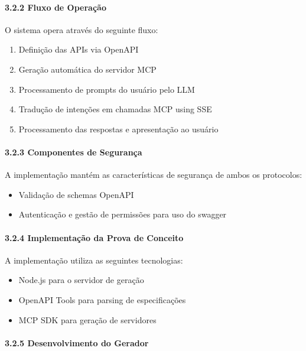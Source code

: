 \documentclass[
]{article}
\providecommand{\tightlist}{%
  \setlength{\itemsep}{0pt}\setlength{\parskip}{0pt}}
\begin{document}
\paragraph{3.2.2 Fluxo de Operação}\label{fluxo-de-operauxe7uxe3o}

O sistema opera através do seguinte fluxo:

\begin{enumerate}
\def\labelenumi{\arabic{enumi}.}
\tightlist
\item
  Definição das APIs via OpenAPI
\item
  Geração automática do servidor MCP
\item
  Processamento de prompts do usuário pelo LLM
\item
  Tradução de intenções em chamadas MCP using SSE
\item
  Processamento das respostas e apresentação ao usuário
\end{enumerate}

\paragraph{3.2.3 Componentes de
Segurança}\label{componentes-de-seguranuxe7a-1}

A implementação mantém as características de segurança de ambos os
protocolos:

\begin{itemize}
\tightlist
\item
  Validação de schemas OpenAPI
\item
  Autenticação e gestão de permissões para uso do swagger
\end{itemize}

\paragraph{3.2.4 Implementação da Prova de
Conceito}\label{implementauxe7uxe3o-da-prova-de-conceito-1}

A implementação utiliza as seguintes tecnologias:

\begin{itemize}
\tightlist
\item
  Node.js para o servidor de geração
\item
  OpenAPI Tools para parsing de especificações
\item
  MCP SDK para geração de servidores
\end{itemize}

\paragraph{3.2.5 Desenvolvimento do
Gerador}\label{desenvolvimento-do-gerador}
\end{document}
